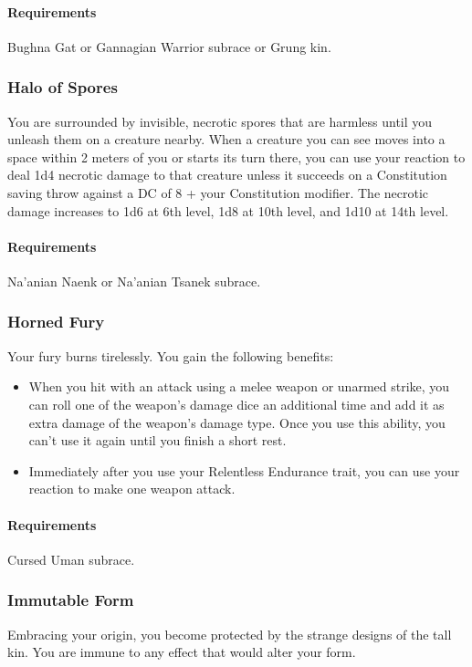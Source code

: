     \paragraph{Requirements} Bughna Gat or Gannagian Warrior subrace or Grung kin.
\subsubsection{Halo of Spores} \label{feat::haloofspores}
    You are surrounded by invisible, necrotic spores that are harmless until you unleash them on a creature nearby.
    When a creature you can see moves into a space within 2 meters of you or starts its turn there, you can use your reaction to deal 1d4 necrotic damage to that creature unless it succeeds on a Constitution saving throw against a DC of 8 + your Constitution modifier.
    The necrotic damage increases to 1d6 at 6th level, 1d8 at 10th level, and 1d10 at 14th level.
    \paragraph{Requirements} Na'anian Naenk or Na'anian Tsanek subrace.
\subsubsection{Horned Fury} \label{feat::hornedfury}
    Your fury burns tirelessly.
    You gain the following benefits:
    \begin{itemize}
        \item When you hit with an attack using a melee weapon or unarmed strike, you can roll one of the weapon's damage dice an additional time and add it as extra damage of the weapon's damage type.
        Once you use this ability, you can't use it again until you finish a short rest.
        \item Immediately after you use your Relentless Endurance trait, you can use your reaction to make one weapon attack.
    \end{itemize}
    \paragraph{Requirements} Cursed Uman subrace.
\subsubsection{Immutable Form} \label{feat::immutableform}
    Embracing your origin, you become protected by the strange designs of the tall kin.
    You are immune to any effect that would alter your form.
